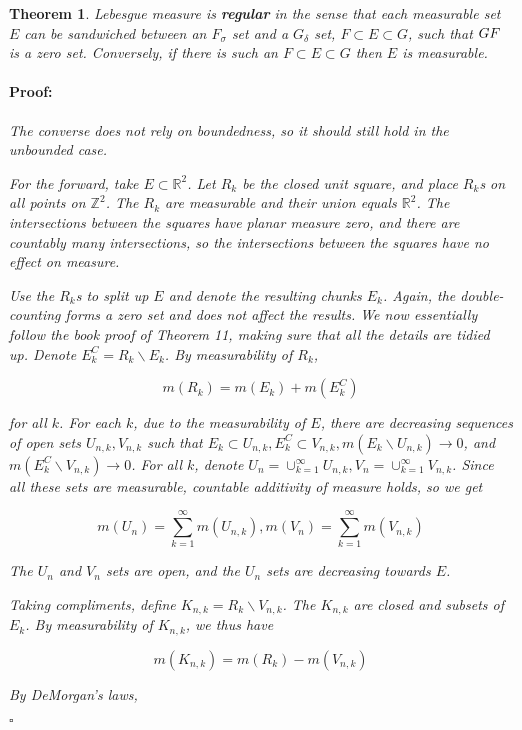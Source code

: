 \documentclass{article}
\newenvironment{proof}{\paragraph{Proof:}}{\hfill$\square$}
\newtheorem{theorem}{Theorem}
\newcommand{\R}{\mathbb{R}}
\newcommand{\Z}{\mathbb{Z}}
\begin{document}
\begin{theorem}
Lebesgue measure is \textbf{regular} in the sense that each measurable set $E$ can be sandwiched between an $F_\sigma$ set and a $G_\delta$ set, $F \subset E \subset G$, such that $G \\ F$ is a zero set. Conversely, if there is such an $F \subset E \subset G$ then $E$ is measurable.

\begin{proof}
The converse does not rely on boundedness, so it should still hold in the unbounded case.

For the forward, take $E \subset \R^2$. Let $R_k$ be the closed unit square, and place $R_k$s on all points on $\Z^2$. The $R_k$ are measurable and their union equals $\R^2$. The intersections between the squares have planar measure zero, and there are countably many intersections, so the intersections between the squares have no effect on measure.

Use the $R_k$s to split up $E$ and denote the resulting chunks $E_k$. Again, the double-counting forms a zero set and does not affect the results. We now essentially follow the book proof of Theorem 11, making sure that all the details are tidied up. Denote $E^C_k = R_k \backslash E_k$. By measurability of $R_k$,

\[
m(R_k) = m(E_k) + m(E^C_k)
\]

for all $k$. For each $k$, due to the measurability of $E$, there are decreasing sequences of open sets $U_{n, k}, V_{n, k}$ such that $E_k \subset U_{n, k}, E^C_k \subset V_{n, k}, m(E_k \backslash U_{n, k}) \rightarrow 0$, and $m(E^C_k \backslash V_{n, k}) \rightarrow 0$. For all $k$, denote $U_n = \cup_{k=1}^{\infty} U_{n, k}, V_n = \cup_{k=1}^{\infty} V_{n, k}$. Since all these sets are measurable, countable additivity of measure holds, so we get

\[
m(U_n) = \sum_{k=1}^\infty m(U_{n, k}), m(V_n) = \sum_{k=1}^\infty m(V_{n, k})
\]

The $U_n$ and $V_n$ sets are open, and the $U_n$ sets are decreasing towards $E$.

Taking compliments, define $K_{n, k} = R_k \backslash V_{n, k}$. The $K_{n,k}$ are closed and subsets of $E_k$. By measurability of $K_{n, k}$, we thus have

\[
m(K_{n,k}) = m(R_k) - m(V_{n, k})
\]

By DeMorgan's laws,

\end{proof}
\end{theorem}
\end{document}
